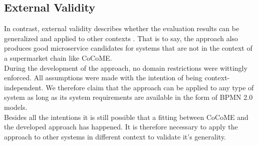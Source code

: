 \subsection{External Validity}
In contrast, external validity describes whether the evaluation results can be generalized and applied to other contexts \cite{Validity}. That is to say, the approach also produces good microservice candidates for systems that are not in the context of a supermarket chain like CoCoME. \\
During the development of the approach, no domain restrictions were wittingly enforced. All assumptions were made with the intention of being context-independent. We therefore claim that the approach can be applied to any type of system as long as its system requirements are available in the form of BPMN 2.0 models. \\
Besides all the intentions it is still possible that a fitting between CoCoME and the developed approach has happened. It is therefore necessary to apply the approach to other systems in different context to validate it's generality.







